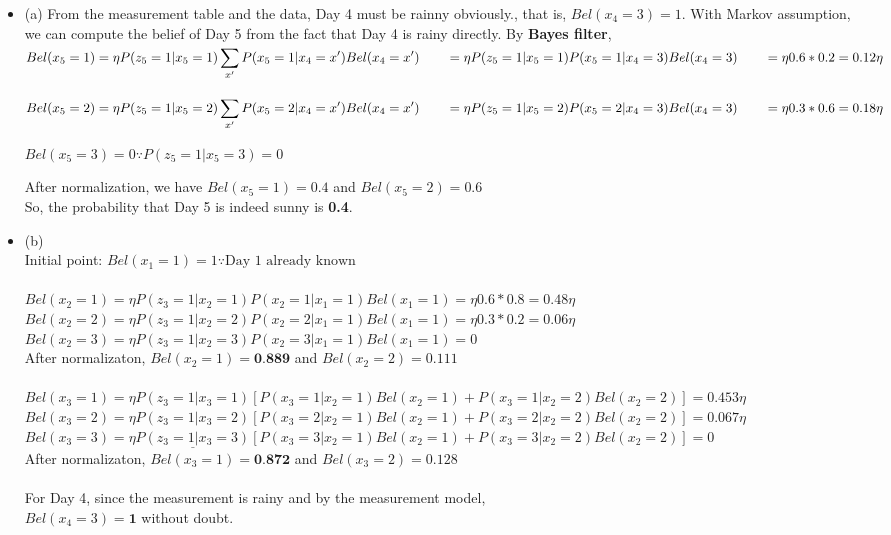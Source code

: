 \documentclass[12pt,a4paper]{article}
\begin{document}
\begin{itemize}
\item{(a)}
From the measurement table and the data, Day 4 must be rainny obviously., that is, $Bel(x_4=3)=1$. With Markov assumption, we can compute the belief of Day 5 from the fact that Day 4 is rainy directly. By \textbf{Bayes filter}, \\

$Bel(x_5=1)=\eta P(z_5=1|x_5=1)\displaystyle\sum_{x'}^{} P(x_5=1|x_4=x')Bel(x_4=x') \\ 
\qquad = \eta P(z_5=1|x_5=1)P(x_5=1|x_4=3)Bel(x_4=3) \\
\qquad = \eta 0.6*0.2 \\ = 0.12\eta$ 

$Bel(x_5=2)=\eta P(z_5=1|x_5=2)\displaystyle\sum_{x'}^{} P(x_5=2|x_4=x')Bel(x_4=x') \\ 
\qquad = \eta P(z_5=1|x_5=2)P(x_5=2|x_4=3)Bel(x_4=3) \\
\qquad = \eta 0.3*0.6 \\ = 0.18\eta$ 

$Bel(x_5=3)=0\because P(z_5=1|x_5=3)=0$

After normalization, we have $Bel(x_5=1)=0.4$ and $Bel(x_5=2)=0.6$ \\
So, the probability that Day 5 is indeed sunny is \textbf{0.4}.

\item{(b)} 
 \\
Initial point: $ Bel(x_1=1)=1 \because \text{Day 1 already known}$ \\ \\
$ Bel(x_2=1)=\eta P(z_3=1|x_2=1)P(x_2=1|x_1=1)Bel(x_1=1)=\eta 0.6*0.8=0.48\eta$ \\ 
$ Bel(x_2=2)=\eta P(z_3=1|x_2=2)P(x_2=2|x_1=1)Bel(x_1=1)=\eta 0.3*0.2=0.06\eta$ \\
$ Bel(x_2=3)=\eta P(z_3=1|x_2=3)P(x_2=3|x_1=1)Bel(x_1=1)=0$ \\
After normalizaton, $ Bel(x_2=1)=\textbf{0.889}$ and $ Bel(x_2=2)= 0.111$ \\ \\

$ \scriptstyle Bel(x_3=1)=\eta P(z_3=1|x_3=1)[P(x_3=1|x_2=1)Bel(x_2=1)+P(x_3=1|x_2=2)Bel(x_2=2)]=0.453\eta$ \\
$ \scriptstyle Bel(x_3=2)=\eta P(z_3=1|x_3=2)[P(x_3=2|x_2=1)Bel(x_2=1)+P(x_3=2|x_2=2)Bel(x_2=2)]=0.067\eta$ \\
$ \scriptstyle Bel(x_3=3)=\eta \underline{P(z_3=1|x_3=3)}[P(x_3=3|x_2=1)Bel(x_2=1)+P(x_3=3|x_2=2)Bel(x_2=2)]=0$ \\
After normalizaton, $ Bel(x_3=1)=\textbf{0.872}$ and $ Bel(x_3=2)=0.128$ \\ \\
For Day 4, since the measurement is rainy and by the measurement model, \\ $ Bel(x_4=3)=\textbf{1}$ without doubt.


\end{itemize}
\end{document}
